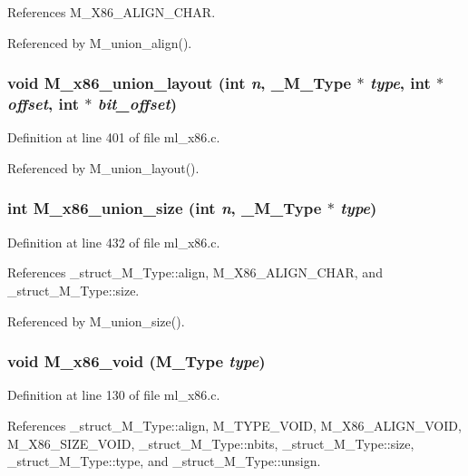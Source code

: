 References M\_\-X86\_\-ALIGN\_\-CHAR.

Referenced by M\_\-union\_\-align().
\subsubsection{\setlength{\rightskip}{0pt plus 5cm}void M\_\-x86\_\-union\_\-layout (int {\em n}, \bf{\_\-M\_\-Type} $\ast$ {\em type}, int $\ast$ {\em offset}, int $\ast$ {\em bit\_\-offset})}\label{ml__x86_8c_6c2824e9db6d21b5d0d69fe70cb0be3e}




Definition at line 401 of file ml\_\-x86.c.

Referenced by M\_\-union\_\-layout().
\subsubsection{\setlength{\rightskip}{0pt plus 5cm}int M\_\-x86\_\-union\_\-size (int {\em n}, \bf{\_\-M\_\-Type} $\ast$ {\em type})}\label{ml__x86_8c_ec220f34827e3091c1624e2c5ac59c31}




Definition at line 432 of file ml\_\-x86.c.

References \_\-struct\_\-M\_\-Type::align, M\_\-X86\_\-ALIGN\_\-CHAR, and \_\-struct\_\-M\_\-Type::size.

Referenced by M\_\-union\_\-size().
\subsubsection{\setlength{\rightskip}{0pt plus 5cm}void M\_\-x86\_\-void (\bf{M\_\-Type} {\em type})}\label{ml__x86_8c_7bdd9e958d231e4f5c4d5be87f5b2364}




Definition at line 130 of file ml\_\-x86.c.

References \_\-struct\_\-M\_\-Type::align, M\_\-TYPE\_\-VOID, M\_\-X86\_\-ALIGN\_\-VOID, M\_\-X86\_\-SIZE\_\-VOID, \_\-struct\_\-M\_\-Type::nbits, \_\-struct\_\-M\_\-Type::size, \_\-struct\_\-M\_\-Type::type, and \_\-struct\_\-M\_\-Type::unsign.

